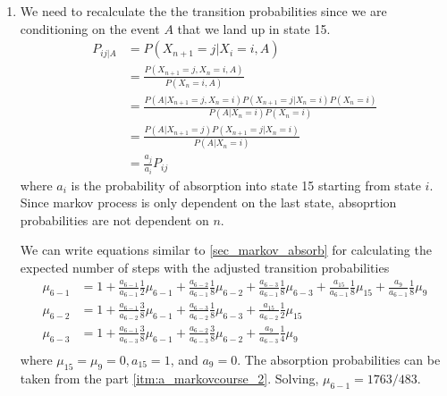 \documentclass[11pt, a4paper]{article}
\begin{document}
\begin{enumerate}
\begin{enumerate}
            \item We need to recalculate the the transition probabilities since we are conditioning on the event $A$ that we land up in state 15.
            \begin{align*}
                P_{ij|A} &= P(X_{n+1}=j|X_{i}=i,A)\\
                &= \frac{P(X_{n+1}=j, X_{n}=i, A)}{P(X_{n}=i, A)}\\
                &= \frac{P(A|X_{n+1}=j, X_{n}=i) P(X_{n+1}=j|X_{n}=i) P(X_{n}=i)}{P(A|X_{n}=i) P(X_{n}=i)}\\
                &= \frac{P(A|X_{n+1}=j) P(X_{n+1}=j|X_{n}=i)}{P(A|X_{n}=i)}\\
                &= \frac{a_{j}}{a_{i}} P_{ij}
            \end{align*}
            where $a_{i}$ is the probability of absorption into state 15 starting from state $i$. Since markov process is only dependent on the last state, absoprtion probabilities are not dependent on $n$.\newline

            We can write equations similar to \ref{sec_markov_absorb} for calculating the expected number of steps with the adjusted transition probabilities
            \begin{align*}
                \mu_{6-1} &= 1 + \frac{a_{6-1}}{a_{6-1}}\frac{1}{2} \mu_{6-1} + \frac{a_{6-2}}{a_{6-1}}\frac{1}{8} \mu_{6-2} + \frac{a_{6-3}}{a_{6-1}}\frac{1}{8} \mu_{6-3} + \frac{a_{15}}{a_{6-1}}\frac{1}{8} \mu_{15}+ \frac{a_{9}}{a_{6-1}}\frac{1}{8} \mu_{9}\\
                \mu_{6-2} &= 1 + \frac{a_{6-1}}{a_{6-2}}\frac{3}{8} \mu_{6-1} + \frac{a_{6-3}}{a_{6-2}}\frac{1}{8} \mu_{6-3} + \frac{a_{15}}{a_{6-2}}\frac{1}{2} \mu_{15}\\
                \mu_{6-3} &= 1 + \frac{a_{6-1}}{a_{6-3}}\frac{3}{8} \mu_{6-1} + \frac{a_{6-2}}{a_{6-3}}\frac{3}{8} \mu_{6-2} + \frac{a_{9}}{a_{6-3}}\frac{1}{4} \mu_{9}\\
            \end{align*}
            where $\mu_{15} = \mu_{9} = 0, a_{15} = 1$, and $a_{9} = 0$. The absorption probabilities can be taken from the part \ref{itm:a_markovcourse_2}. Solving, $\mu_{6-1} = 1763/483$.


\end{enumerate}
\end{enumerate}
\end{document}
